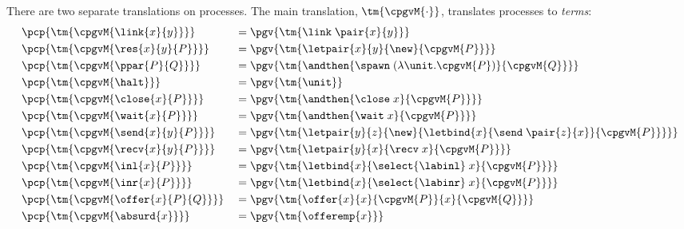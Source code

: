 There are two separate translations on processes. The main translation, $\tm{\cpgvM{\cdot}}$, translates processes to \emph{terms}:
\begin{align*}
   & \pcp{\tm{\cpgvM{\link{x}{y}}}}
   &                                    & = \pgv{\tm{\link\;{\pair{x}{y}}}}                                               \\
   & \pcp{\tm{\cpgvM{\res{x}{y}{P}}}}
   &                                    & = \pgv{\tm{\letpair{x}{y}{\new}{\cpgvM{P}}}}                                    \\
   & \pcp{\tm{\cpgvM{\ppar{P}{Q}}}}
   &                                    & = \pgv{\tm{\andthen{\spawn\;{(\lambda\unit.\cpgvM{P})}}{\cpgvM{Q}}}}            \\
   & \pcp{\tm{\cpgvM{\halt}}}
   &                                    & = \pgv{\tm{\unit}}                                                              \\
   & \pcp{\tm{\cpgvM{\close{x}{P}}}}
   &                                    & = \pgv{\tm{\andthen{\close\;{x}}{\cpgvM{P}}}}                                   \\
   & \pcp{\tm{\cpgvM{\wait{x}{P}}}}
   &                                    & = \pgv{\tm{\andthen{\wait\;{x}}{\cpgvM{P}}}}                                    \\
   & \pcp{\tm{\cpgvM{\send{x}{y}{P}}}}
   &                                    & = \pgv{\tm{\letpair{y}{z}{\new}{\letbind{x}{\send\;{\pair{z}{x}}}{\cpgvM{P}}}}} \\
   & \pcp{\tm{\cpgvM{\recv{x}{y}{P}}}}
   &                                    & = \pgv{\tm{\letpair{y}{x}{\recv\;{x}}{\cpgvM{P}}}}                              \\
   & \pcp{\tm{\cpgvM{\inl{x}{P}}}}
   &                                    & = \pgv{\tm{\letbind{x}{\select{\labinl}\;{x}}{\cpgvM{P}}}}                      \\
   & \pcp{\tm{\cpgvM{\inr{x}{P}}}}
   &                                    & = \pgv{\tm{\letbind{x}{\select{\labinr}\;{x}}{\cpgvM{P}}}}                      \\
   & \pcp{\tm{\cpgvM{\offer{x}{P}{Q}}}}
   &                                    & = \pgv{\tm{\offer{x}{x}{\cpgvM{P}}{x}{\cpgvM{Q}}}}                              \\
   & \pcp{\tm{\cpgvM{\absurd{x}}}}
   &                                    & = \pgv{\tm{\offeremp{x}}}
\end{align*}

